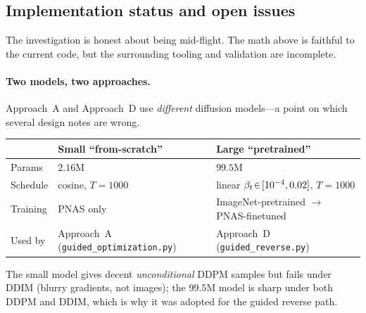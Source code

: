 \subsection{Implementation status and open issues}\label{sec:diff-status}

The investigation is honest about being mid-flight. The math above is faithful to
the current code, but the surrounding tooling and validation are incomplete.

\paragraph{Two models, two approaches.}
Approach~A and Approach~D use \emph{different} diffusion models---a point on which
several design notes are wrong.
\begin{center}\small
\begin{tabular}{@{}lll@{}}
\toprule
 & Small ``from-scratch'' & Large ``pretrained'' \\
\midrule
Params   & $2.16$M & $99.5$M \\
Schedule & cosine, $T=1000$ & linear $\beta_{t}\!\in\![10^{-4},0.02]$, $T=1000$ \\
Training & PNAS only & ImageNet-pretrained $\to$ PNAS-finetuned \\
Used by  & Approach~A (\texttt{guided\_optimization.py}) & Approach~D (\texttt{guided\_reverse.py}) \\
\bottomrule
\end{tabular}
\end{center}
The small model gives decent \emph{unconditional} DDPM samples but fails under
DDIM (blurry gradients, not images); the $99.5$M model is sharp under both DDPM
and DDIM, which is why it was adopted for the guided reverse path.


